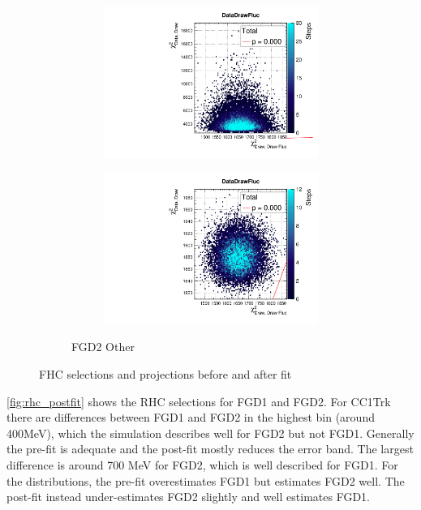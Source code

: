 \begin{figure}[h]
\begin{subfigure}[t]{\textwidth}
\begin{subfigure}[t]{0.24\textwidth}
\includegraphics[width=\textwidth, trim={0mm 0mm 0mm 8mm}, clip,page=56]{figures/mach3/data/priorpred/2017b_NewDet_3Xsec_4Det_5Flux_NewXSecTune_Data_merge_PriorPred_procs}
\end{subfigure}
\begin{subfigure}[t]{0.24\textwidth}
	\includegraphics[width=\textwidth, trim={0mm 0mm 0mm 8mm}, clip,page=56]{figures/mach3/data/postpred/2017b_NewData_NewDet_UpdXsecStep_2Xsec_4Det_5Flux_0_PostPred_procs}
\end{subfigure}
\caption{FGD2 Other}
\end{subfigure}
\caption{FHC selections \pmu and \cosmu projections before and after fit}
\label{fig:fhc_postfit_other}
\end{figure}

\autoref{fig:rhc_postfit} shows the RHC \numubar selections for FGD1 and FGD2. For CC1Trk there are differences between FGD1 and FGD2 in the highest bin (around 400MeV), which the simulation describes well for FGD2 but not FGD1. Generally the pre-fit is adequate and the post-fit mostly reduces the error band. The largest difference is around 700 MeV for FGD2, which is well described for FGD1. For the \cosmu distributions, the pre-fit overestimates FGD1 but estimates FGD2 well. The post-fit instead under-estimates FGD2 slightly and well estimates FGD1.

